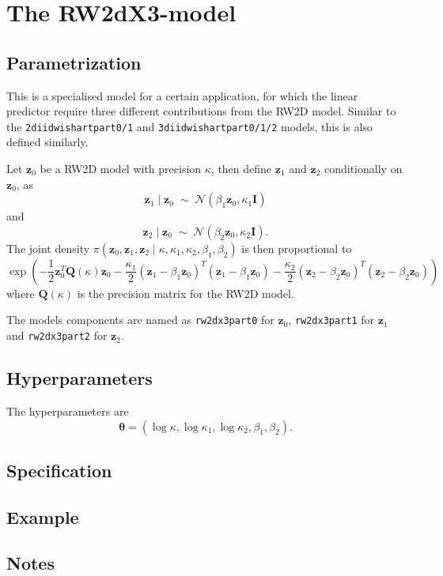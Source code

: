 \documentclass[a4paper,11pt]{article}
\begin{document}
\section*{The RW2dX3-model}
\subsection*{Parametrization}

This is a specialised model for a certain application, for which the
linear predictor require three different contributions from the RW2D
model. Similar to the {\tt 2diidwishartpart0/1} and
{\tt 3diidwishartpart0/1/2} models, this is also defined similarly.

Let $\mathbf{z}_{0}$ be a RW2D model with precision $\kappa$, then define
$\mathbf{z}_{1}$ and $\mathbf{z}_{2}$ conditionally on $\mathbf{z}_{0}$, as
\begin{displaymath}
    \mathbf{z}_{1} \mid \mathbf{z}_{0} \;\sim\; {\mathcal N}( \beta_{1}
    \mathbf{z}_{0}, \kappa_{1}\mathbf{I})                                    
\end{displaymath}
and 
\begin{displaymath}
    \mathbf{z}_{2} \mid \mathbf{z}_{0} \;\sim\; {\mathcal N}( \beta_{2}
    \mathbf{z}_{0}, \kappa_{2}\mathbf{I}).
\end{displaymath}
The joint density $\pi(\mathbf{z}_{0}, \mathbf{z}_{1}, \mathbf{z}_{2} \mid \kappa,
\kappa_{1}, \kappa_{2}, \beta_{1}, \beta_{2})$ is then proportional to
\begin{displaymath}
    \exp\left(
      -\frac{1}{2} \mathbf{z}_{0}^{T}\mathbf{Q}(\kappa) \mathbf{z}_{0}
      -\frac{\kappa_{1}}{2} (\mathbf{z}_{1} - \beta_{1}\mathbf{z}_{0})^{T}
      (\mathbf{z}_{1} - \beta_{1}\mathbf{z}_{0})
      -\frac{\kappa_{2}}{2} (\mathbf{z}_{2} - \beta_{2}\mathbf{z}_{0})^{T}
      (\mathbf{z}_{2} - \beta_{2}\mathbf{z}_{0})\right)
\end{displaymath}
where $\mathbf{Q}(\kappa)$ is the precision matrix for the RW2D model.

The models components are named as {\tt rw2dx3part0} for
$\mathbf{z}_{0}$, {\tt rw2dx3part1} for $\mathbf{z}_{1}$ and
{\tt rw2dx3part2} for $\mathbf{z}_{2}$. 


\subsection*{Hyperparameters}

The hyperparameters are
\begin{displaymath}
    \mathbf{\theta} = (\log \kappa, \log \kappa_{1}, \log \kappa_{2}, \beta_{1}, \beta_{2}).
\end{displaymath}

\subsection*{Specification}
\subsection*{Example}
\subsection*{Notes}
\end{document}
